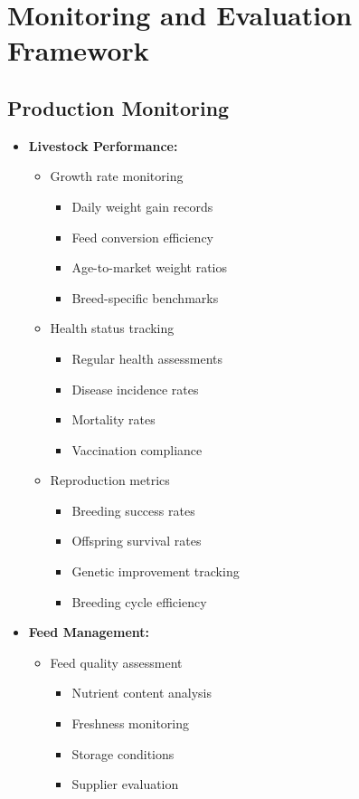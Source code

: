 \section{Monitoring and Evaluation Framework}

\subsection{Production Monitoring}
\begin{itemize}
    \item \textbf{Livestock Performance:}
    \begin{itemize}
        \item Growth rate monitoring
        \begin{itemize}
            \item Daily weight gain records
            \item Feed conversion efficiency
            \item Age-to-market weight ratios
            \item Breed-specific benchmarks
        \end{itemize}
        
        \item Health status tracking
        \begin{itemize}
            \item Regular health assessments
            \item Disease incidence rates
            \item Mortality rates
            \item Vaccination compliance
        \end{itemize}
        
        \item Reproduction metrics
        \begin{itemize}
            \item Breeding success rates
            \item Offspring survival rates
            \item Genetic improvement tracking
            \item Breeding cycle efficiency
        \end{itemize}
    \end{itemize}
    
    \item \textbf{Feed Management:}
    \begin{itemize}
        \item Feed quality assessment
        \begin{itemize}
            \item Nutrient content analysis
            \item Freshness monitoring
            \item Storage conditions
            \item Supplier evaluation
        \end{itemize}
        

\end{itemize}
\end{itemize}
